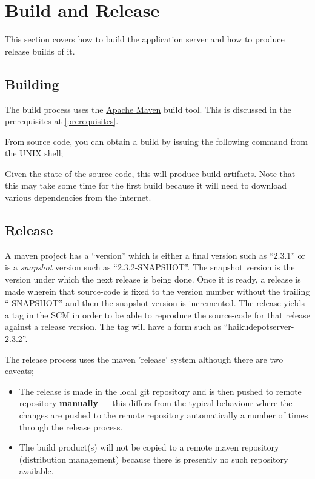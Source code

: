 
\section{Build and Release}
\label{buildandrelease}

This section covers how to build the application server and how to produce release builds of it.

\subsection{Building}

The build process uses the \href{http://maven.apache.org}{Apache Maven} build tool.  This is discussed in the prerequisites at \ref{prerequisites}.

From source code, you can obtain a build by issuing the following command from the UNIX shell;


Given the state of the source code, this will produce build artifacts.  Note that this may take some time for the first build because it will need to download various dependencies from the internet.

\subsection{Release}

A maven project has a ``version'' which is either a final version such as ``2.3.1'' or is a {\it snapshot} version such as ``2.3.2-SNAPSHOT''.  The snapshot version is the version under which the next release is being done.  Once it is ready, a release is made wherein that source-code is fixed to the version number without the trailing ``-SNAPSHOT'' and then the snapshot version is incremented.  The release yields a tag in the SCM in order to be able to reproduce the source-code for that release against a release version.  The tag will have a form such as ``haikudepotserver-2.3.2''.

 The release process uses the maven 'release' system although there are two caveats;

 \begin{itemize}
 \item The release is made in the local git repository and is then pushed to remote repository {\bf manually} --- this differs from the typical behaviour where the changes are pushed to the remote repository automatically a number of times through the release process.
 \item The build product(s) will not be copied to a remote maven repository (distribution management) because there is presently no such repository available.
 \end{itemize}

